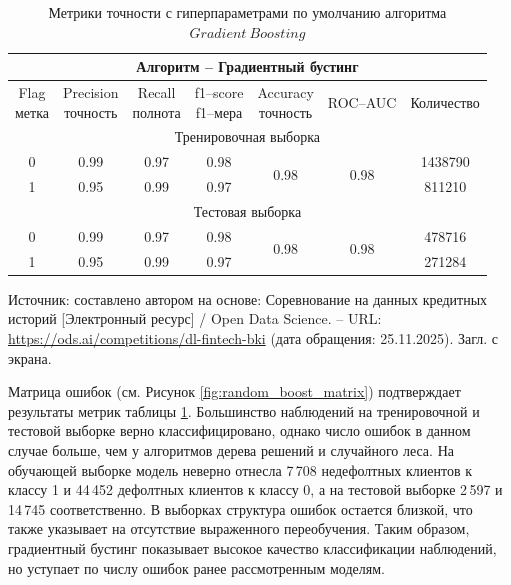 \begin{center}
	\begin{longtable}{|c|c|c|c|c|c|c|}
		\caption{Метрики точности с гиперпараметрами по умолчанию алгоритма $Gradient\ Boosting$}
		\label{metrics_boost_default} \\
		\hline
		\multicolumn{7}{|c|}{Алгоритм -- Градиентный бустинг}\\
		\hline
		\rowcolor[gray]{.9}
		\specialcell{Flag\\метка} &
		\specialcell{Precision\\точность} &
		\specialcell{Recall\\полнота} &
		\specialcell{f1--score\\f1--мера} &
		\specialcell{Accuracy\\точность}  &
		ROC--AUC &
		Количество    \\
		\hline
		\multicolumn{7}{|c|}{Тренировочная выборка}\\
		\hline
		0 & 0.99 & 0.97 & 0.98 &
		\multirow{2}{*}{0.98} &   
		\multirow{2}{*}{0.98} &  
		1438790\\                    
		\cline{1-4} \cline{7-7}
		1 & 0.95 & 0.99 & 0.97 &  
		&      & 811210 \\       
		\hline
		\multicolumn{7}{|c|}{Тестовая выборка} \\
		\hline
		0 & 0.99 & 0.97 & 0.98 &
		\multirow{2}{*}{0.98} &
		\multirow{2}{*}{0.98} &
		478716 \\
		\cline{1-4} \cline{7-7}
		1 & 0.95 & 0.99 & 0.97 & & & 271284 \\
		\hline
	\end{longtable}
	\begin{minipage}{\textwidth}
		\fontsize{9}{11}\selectfont
		\justifying
		Источник: составлено автором на основе: Соревнование на данных кредитных историй [Электронный ресурс] / Open Data Science. -- URL: \url{https://ods.ai/competitions/dl-fintech-bki} (дата обращения: 25.11.2025). Загл. с экрана.
	\end{minipage}
\end{center}

Матрица ошибок (см. Рисунок \ref{fig:random_boost_matrix}) подтверждает результаты метрик таблицы \ref{metrics_boost_default}. Большинство наблюдений на тренировочной и тестовой выборке верно классифицировано, однако число ошибок в данном случае больше, чем у алгоритмов дерева решений и случайного леса. На обучающей выборке модель неверно отнесла 7\,708 недефолтных клиентов к классу 1 и 44\,452 дефолтных клиентов к классу 0, а на тестовой выборке 2\,597 и 14\,745 соответственно. В выборках структура ошибок остается близкой, что также указывает на отсутствие выраженного переобучения. Таким образом, градиентный бустинг показывает высокое качество классификации наблюдений, но уступает по числу ошибок ранее рассмотренным моделям.

